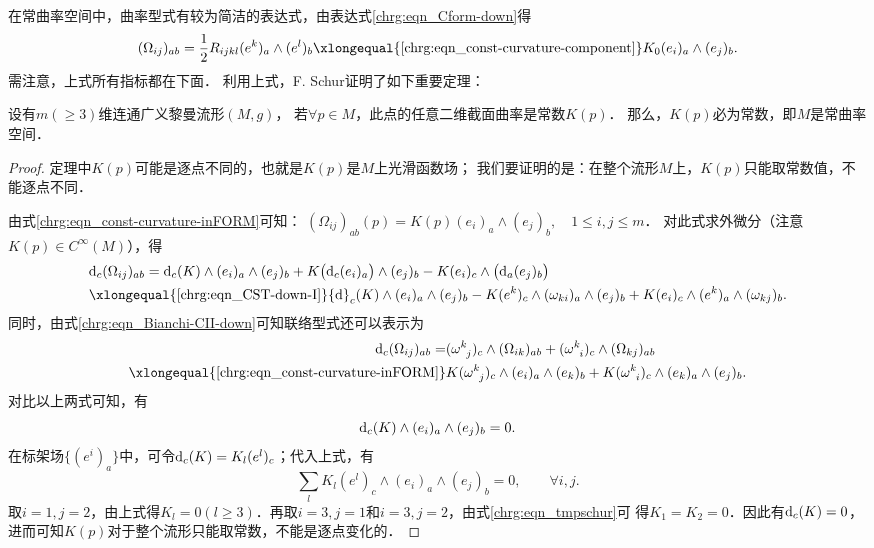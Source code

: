在常曲率空间中，曲率型式有较为简洁的表达式，由表达式\eqref{chrg:eqn_Cform-down}得
\begin{equation}\label{chrg:eqn_const-curvature-inFORM}
    (\Omega_{ij})_{ab} = \frac{1}{2}R_{ijkl} (e^k)_a \wedge (e^l)_b
    \xlongequal{\ref{chrg:eqn_const-curvature-component}}
    K_0 (e_i)_a \wedge (e_j)_b .
\end{equation}
需注意，上式所有指标都在下面．
利用上式，F. Schur证明了如下重要定理：
\begin{theorem}\label{chrg:thm_Schur-lemma}
    设有$m(\geqslant 3)$维连通广义黎曼流形$(M,g)$，
    若$\forall p\in M$，此点的任意二维截面曲率是常数$K(p)$．
    那么，$K(p)$必为常数，即$M$是常曲率空间．
\end{theorem}
\begin{proof}
    定理中$K(p)$可能是逐点不同的，也就是$K(p)$是$M$上光滑函数场；
    我们要证明的是：在整个流形$M$上，$K(p)$只能取常数值，不能逐点不同．

    由式\eqref{chrg:eqn_const-curvature-inFORM}可知：
    $(\Omega_{ij})_{ab}(p) = K(p) (e_i)_a \wedge (e_j)_b , \quad 1\leqslant i,j \leqslant m$．
    对此式求外微分（注意$K(p)\in C^\infty(M)$），得
    \begin{align*}
        &{\rm d}_c(\Omega_{ij})_{ab} = {\rm d}_c (K)\wedge (e_i)_a \wedge (e_j)_b
        + K \bigl({\rm d}_c(e_i)_a \bigr) \wedge (e_j)_b - K (e_i)_c \wedge \bigl({\rm d}_a (e_j)_b \bigr) \\
        &\xlongequal{\ref{chrg:eqn_CST-down-I}} {\rm d}_c (K)\wedge (e_i)_a \wedge (e_j)_b
        - K (e^k)_c \wedge (\omega_{k i})_a \wedge (e_j)_b
        + K (e_i)_c \wedge (e^k)_a \wedge (\omega_{k j})_b .
    \end{align*}
    同时，由式\eqref{chrg:eqn_Bianchi-CII-down}可知联络型式还可以表示为
    \begin{align*}
      {\rm d}_c (\Omega_{ij})_{ab}  =&  ( \omega _{\hphantom{k} j}^k )_c
      \wedge (\Omega_{i k} )_{ab} + ( \omega _{\hphantom{k} i}^{k} )_c \wedge (\Omega_{k j})_{ab}   \\
      \xlongequal{\ref{chrg:eqn_const-curvature-inFORM}}&
      K( \omega _{\hphantom{k} j}^k )_c \wedge (e_i)_a \wedge (e_k)_b
      +K ( \omega _{\hphantom{k} i}^{k} )_c \wedge (e_k)_a \wedge (e_j)_b .
    \end{align*}
    对比以上两式可知，有
    \begin{equation}
        {\rm d}_c (K)\wedge (e_i)_a \wedge (e_j)_b = 0.
    \end{equation}
    在标架场$\{(e^i)_a\}$中，可令${\rm d}_c (K) = K_l (e^l)_c$；代入上式，有
    \begin{equation}\label{chrg:eqn_tmpschur}
       \sum_{l } K_l (e^l)_c \wedge (e_i)_a \wedge (e_j)_b = 0, \qquad \forall i,j .
    \end{equation}
    取$i=1,j=2$，由上式得$K_l=0(l \geqslant 3)$．再取$i=3,j=1$和$i=3,j=2$，由式\eqref{chrg:eqn_tmpschur}可
    得$K_1=K_2=0$．因此有${\rm d}_c (K) = 0$，进而可知$K(p)$对于整个流形只能取常数，不能是逐点变化的．
\end{proof}

